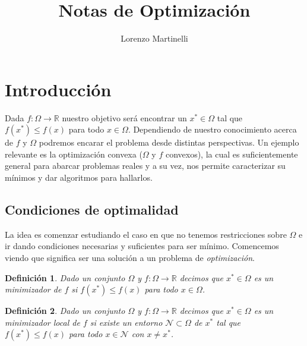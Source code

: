 \documentclass[11pt]{article}
\title{\Huge Notas de Optimización}
\author{Lorenzo Martinelli}
\theoremstyle{ejstyle}
\theoremstyle{ejstyle}
\newtheorem{definicion}{Definición}
\theoremstyle{ejstyle}
\theoremstyle{ejstyle}
\theoremstyle{ejstyle}
\theoremstyle{ejstyle}
\theoremstyle{ejstyle}
\begin{document}
	
	\maketitle

	

	\tableofcontents
	
	
	\section{Introducción} 
	
	Dada $f : \Omega \longrightarrow \mathbb{R}$ nuestro objetivo será encontrar un $x^{*} \in \Omega$ tal que $f(x^{*}) \leq f(x)$ para todo $x \in \Omega$. Dependiendo de nuestro conocimiento acerca de $f$ y $\Omega$ podremos encarar el problema desde distintas perspectivas. Un ejemplo relevante es la optimización convexa ($\Omega$ y $f$ convexos), la cual es suficientemente general para abarcar problemas reales y a su vez, nos permite caracterizar su mínimos y dar algoritmos para hallarlos. 
	
	\subsection{Condiciones de optimalidad}
	
	La idea es comenzar estudiando el caso en que no tenemos restricciones sobre $\Omega$ e ir dando condiciones necesarias y suficientes para ser mínimo. Comencemos viendo que significa ser una solución a un problema de \emph{optimización}.
	
	\begin{definicion}
		Dado un conjunto $\Omega$ y $f : \Omega \longrightarrow \mathbb{R}$ decimos que $x^{*} \in \Omega$ es un minimizador de $f$ si $f(x^{*}) \leq f(x)$ para todo $x \in \Omega$.
	\end{definicion}
	
	
	\begin{definicion}
		Dado un conjunto $\Omega$ y $f : \Omega \longrightarrow \mathbb{R}$ decimos que $x^{*} \in \Omega$ es un minimizador local de $f$ si existe un entorno $\mathcal{N} \subset \Omega$ de $x^{*}$ tal que $f(x^{*}) \leq f(x)$ para todo $x \in \mathcal{N}$ con $x \neq x^{*}$.
	\end{definicion}
	
\end{document}
